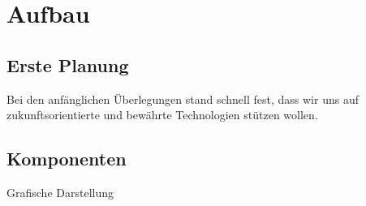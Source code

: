 \chapter{Aufbau}

\section{Erste Planung}
Bei den anfänglichen Überlegungen stand schnell fest, dass wir uns auf zukunftsorientierte und bewährte Technologien stützen wollen.

\section{Komponenten}

Grafische Darstellung

